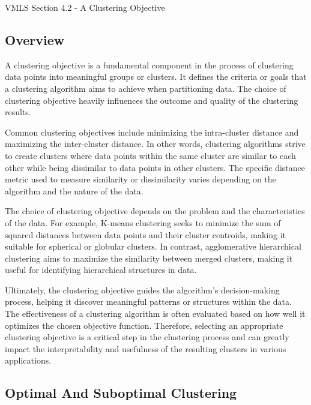 \begin{notes}{VMLS Section 4.2 - A Clustering Objective}
    \subsection*{Overview}

    A clustering objective is a fundamental component in the process of clustering data points into meaningful groups or clusters. It defines the criteria or goals that a clustering algorithm aims to 
    achieve when partitioning data. The choice of clustering objective heavily influences the outcome and quality of the clustering results.

    Common clustering objectives include minimizing the intra-cluster distance and maximizing the inter-cluster distance. In other words, clustering algorithms strive to create clusters where data 
    points within the same cluster are similar to each other while being dissimilar to data points in other clusters. The specific distance metric used to measure similarity or dissimilarity varies 
    depending on the algorithm and the nature of the data.

    The choice of clustering objective depends on the problem and the characteristics of the data. For example, K-means clustering seeks to minimize the sum of squared distances between data points and 
    their cluster centroids, making it suitable for spherical or globular clusters. In contrast, agglomerative hierarchical clustering aims to maximize the similarity between merged clusters, making it 
    useful for identifying hierarchical structures in data.

    Ultimately, the clustering objective guides the algorithm's decision-making process, helping it discover meaningful patterns or structures within the data. The effectiveness of a clustering algorithm 
    is often evaluated based on how well it optimizes the chosen objective function. Therefore, selecting an appropriate clustering objective is a critical step in the clustering process and can greatly 
    impact the interpretability and usefulness of the resulting clusters in various applications.

    \subsection*{Optimal And Suboptimal Clustering}


\end{notes}

